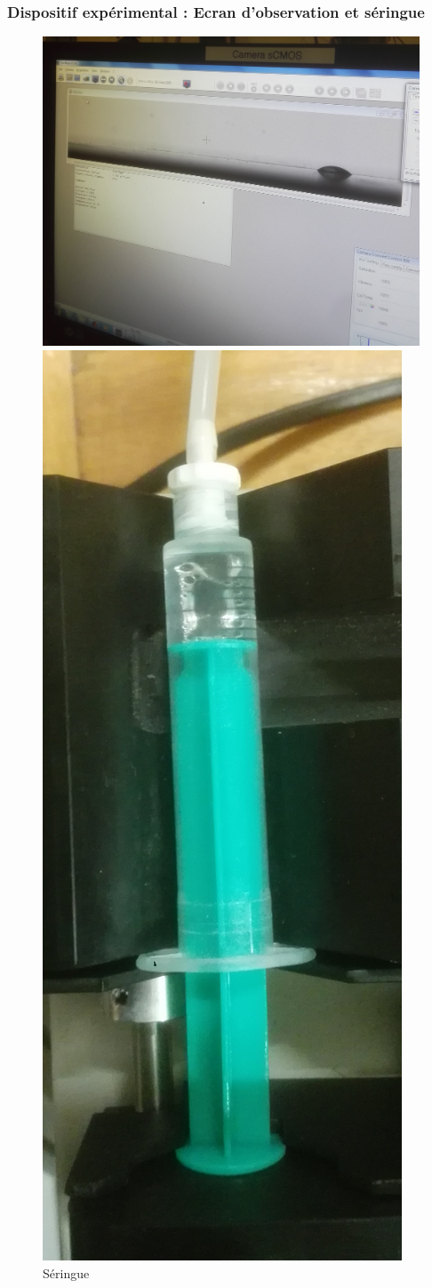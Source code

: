 \documentclass{beamer}
\begin{document}
\begin{frame}
\frametitle{Dispositif expérimental : Ecran d'observation et séringue}
\begin{figure}[!ht]
	\centering
	\begin{minipage}{0.4\linewidth}
		\includegraphics[width = \linewidth]{./image/Ecran.jpg}
		\caption{Ecran d'observation}
	\end{minipage}
	\hfill
	\begin{minipage}{0.4\linewidth}
		\includegraphics[height=0.8\linewidth,center]
		{./image/seringue.jpg}
		\caption{Séringue}
	\end{minipage}
\end{figure}
\end{frame}
\end{document}
